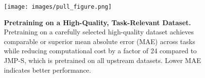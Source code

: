 \begin{figure}[t]
\centering
\texttt{[image: images/pull\_figure.png]}
\vspace{-0.8cm}
\caption{\textbf{Pretraining on a High-Quality, Task-Relevant Dataset.} Pretraining on a carefully selected high-quality dataset achieves comparable or superior mean absolute error (MAE) across tasks while reducing computational cost by a factor of 24 compared to JMP-S, which is pretrained on all upstream datasets. Lower MAE indicates better performance.}
\vspace{-0.4cm}
\label{fig:pull_figure}
\end{figure}

